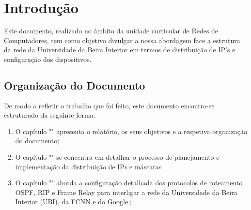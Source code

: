 \section{Introdução}
\label{sec:intro}
Este documento, realizado no âmbito da unidade curricular de Redes de Computadores, tem como objetivo
divulgar a nossa abordagem face a estrutura da rede da Universidade da Beira Interior em termos de distribuição de IP's e
configuração dos dispositivos.

\subsection{Organização do Documento}

De modo a refletir o trabalho que foi feito, este documento encontra-se estruturado da seguinte forma:
\begin{enumerate}
  \item O capítulo "" apresenta o relatório, os seus objetivos e a respetiva organização do documento;

  \item O capítulo "" se concentra em detalhar o processo de planejamento e implementação da
        distribuição de IPs e máscaras

  \item O capítulo "" aborda a configuração detalhada dos protocolos de roteamento OSPF, RIP e Frame Relay
        para interligar a rede da Universidade da Beira Interior (UBI), da FCNN e do Google.;

\end{enumerate}
